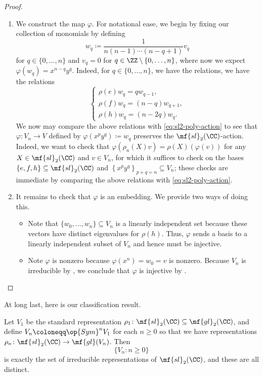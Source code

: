 \documentclass[../notes.tex]{subfiles}
\begin{document}
\begin{proof}
\begin{enumerate}
		\item We construct the map $\varphi$. For notational ease, we begin by fixing our collection of monomials by defining
		\[w_q\coloneqq\frac1{n(n-1)\cdots(n-q+1)}v_q\]
		for $q\in\{0,\ldots,n\}$ and $v_q=0$ for $q\in\ZZ\setminus\{0,\ldots,n\}$, where now we expect $\varphi(w_q)=x^{n-q}y^q$. Indeed, for $q\in\{0,\ldots,n\}$, we have the relations, we have the relations
		\[\begin{cases}
			\rho(e)w_q=qw_{q-1}, \\
			\rho(f)w_q=(n-q)w_{q+1}, \\
			\rho(h)w_q=(n-2q)w_q.
		\end{cases}\]
		We now may compare the above relations with \eqref{eq:sl2-poly-action} to see that $\varphi\colon V_n\to V$ defined by $\varphi\left(x^py^q\right)\coloneqq w_q$ preserves the $\mf{sl}_2(\CC)$-action. Indeed, we want to check that $\varphi(\rho_n(X)v)=\rho(X)(\varphi(v))$ for any $X\in\mf{sl}_2(\CC)$ and $v\in V_n$, for which it suffices to check on the bases $\{e,f,h\}\subseteq\mf{sl}_2(\CC)$ and $\left\{x^py^q\right\}_{p+q=n}\subseteq V_n$; these checks are immediate by comparing the above relations with \eqref{eq:sl2-poly-action}.

		\item It remains to check that $\varphi$ is an embedding. We provide two ways of doing this.
		\begin{itemize}
			\item Note that $\{w_0,\ldots,w_n\}\subseteq V_n$ is a linearly independent set because these vectors have distinct eigenvalues for $\rho(h)$. Thus, $\varphi$ sends a basis to a linearly independent subset of $V_n$ and hence must be injective.
			\item Note $\varphi$ is nonzero because $\varphi\left(x^n\right)=w_0=v$ is nonzero. Because $V_n$ is irreducible by , we conclude that $\varphi$ is injective by .
			\qedhere
		\end{itemize}
	\end{enumerate}
\end{proof}
At long last, here is our classification result.
\begin{theorem} \label{thm:sl2-classify-irreps}
	Let $V_1$ be the standard representation $\rho_1\colon\mf{sl}_2(\CC)\subseteq\mf{gl}_2(\CC)$, and define $V_n\coloneqq\op{Sym}^nV_1$ for each $n\ge0$ so that we have representations $\rho_n\colon\mf{sl}_2(\CC)\to\mf{gl}(V_n)$. Then
	\[\{V_n:n\ge0\}\]
	is exactly the set of irreducible representations of $\mf{sl}_2(\CC)$, and these are all distinct.
\end{theorem}
\end{document}
